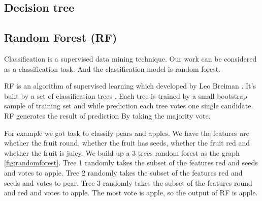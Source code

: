 \subsection{ Decision tree} %
\begin{figure}[!h]
\center
{}
\label{fig:DeTree}
\end{figure}

\subsection{Random Forest (RF)} %
\label{random_forest}
Classification is a supervised data mining technique. Our work can be considered as a classification task. And the classification model is random forest.

RF is an algorithm of supervised learning which developed by Leo Breiman \cite{breiman2001random}. It's built by a set of classification trees \cite{breiman1984classification}. Each tree is trained by a small bootstrap sample of training set and while prediction each tree votes one single candidate. RF generates the result of prediction By taking the majority vote. 

For example we got task to classify pears and apples. We have the features are whether the fruit round, whether the fruit has seeds, whether the fruit red and whether the fruit is juicy. We build up a 3 trees random forest as the graph \ref{fig:randomforest}. Tree 1 randomly takes the subset of the features red and seeds and votes to apple. Tree 2 randomly takes the subset of the features red and seeds and votes to pear. Tree 3 randomly takes the subset of the features round and red and votes to apple. The most vote is apple, so the output of RF is apple.

